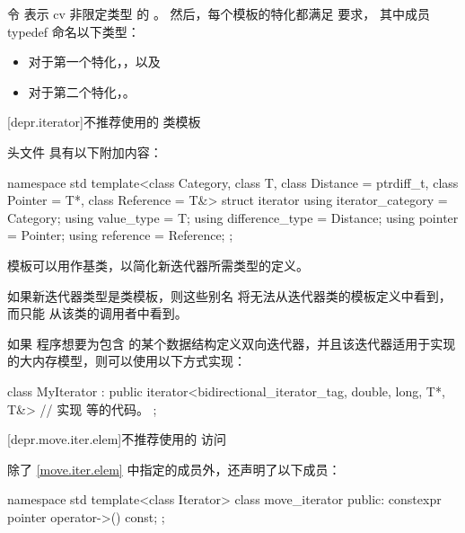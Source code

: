 \begin{itemdescr}
\pnum
令  表示 cv 非限定类型 
的 。
然后，每个模板的特化都满足
 要求，
其中成员 typedef  命名以下类型：
\begin{itemize}
\item 对于第一个特化，，以及
\item 对于第二个特化，。
\end{itemize}
\end{itemdescr}

[depr.iterator]{不推荐使用的  类模板}

\pnum
头文件  具有以下附加内容：

%
\begin{codeblock}
namespace std {
  template<class Category, class T, class Distance = ptrdiff_t,
           class Pointer = T*, class Reference = T&>
  struct iterator {
    using iterator_category = Category;
    using value_type        = T;
    using difference_type   = Distance;
    using pointer           = Pointer;
    using reference         = Reference;
  };
}
\end{codeblock}

\pnum
{}
模板可以用作基类，以简化新迭代器所需类型的定义。

\pnum
\begin{note}
如果新迭代器类型是类模板，则这些别名
将无法从迭代器类的模板定义中看到，而只能
从该类的调用者中看到。
\end{note}

\pnum
\begin{example}
如果 \Cpp{} 程序想要为包含  的某个数据结构定义双向迭代器，并且该迭代器适用于实现的大内存模型，则可以使用以下方式实现：

\begin{codeblock}
class MyIterator :
  public iterator<bidirectional_iterator_tag, double, long, T*, T&> {
  // 实现 \tcode{++} 等的代码。
};
\end{codeblock}
\end{example}

[depr.move.iter.elem]{不推荐使用的  访问}

\pnum
除了 \ref{move.iter.elem} 中指定的成员外，还声明了以下成员：

\begin{codeblock}
namespace std {
  template<class Iterator>
  class move_iterator {
  public:
    constexpr pointer operator->() const;
  };
}
\end{codeblock}

